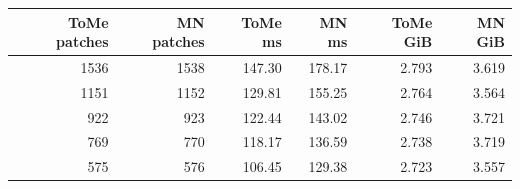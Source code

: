 \begin{tabular}{rrrrrr}
\toprule
ToMe patches & MN patches & ToMe ms & MN ms & ToMe GiB & MN GiB \\
\midrule
1536 & 1538 & 147.30 & 178.17 & 2.793 & 3.619 \\
1151 & 1152 & 129.81 & 155.25 & 2.764 & 3.564 \\
922 & 923 & 122.44 & 143.02 & 2.746 & 3.721 \\
769 & 770 & 118.17 & 136.59 & 2.738 & 3.719 \\
575 & 576 & 106.45 & 129.38 & 2.723 & 3.557 \\
\bottomrule
\end{tabular}
